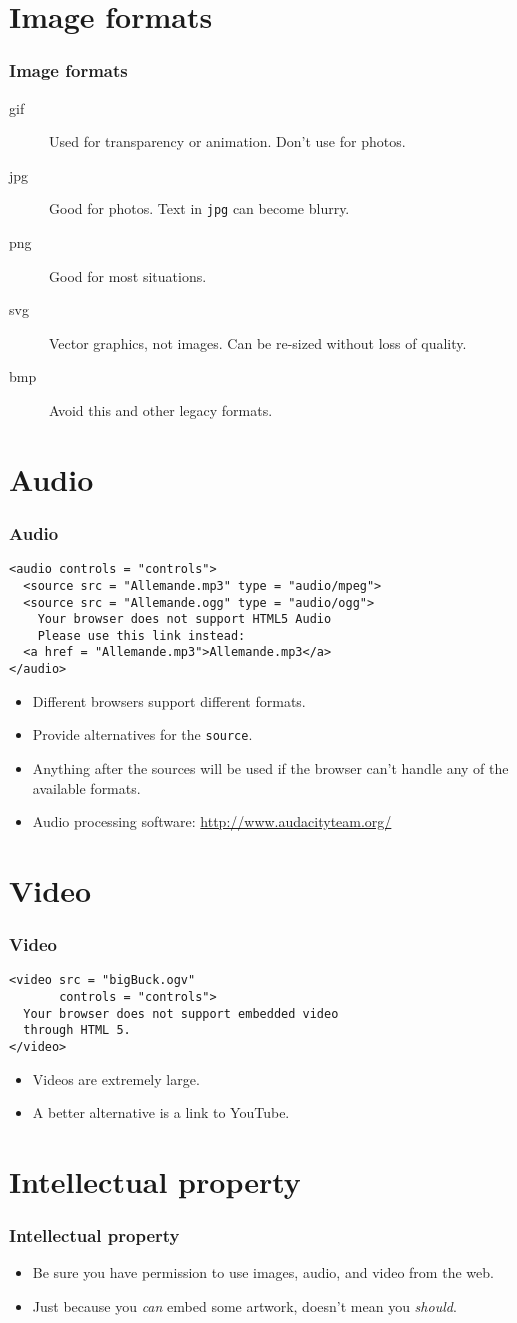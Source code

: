 \documentclass{beamer}
\newcommand{\bi}{\begin{itemize}}
\newcommand{\li}{\item}
\newcommand{\ei}{\end{itemize}}
\newcommand{\sect}[1]{
\section{#1}
\begin{frame}[fragile]\frametitle{#1}
}
\begin{document}
\sect{Image formats}
\begin{description}
  \li[gif] Used for transparency or animation.  Don't use for photos.
  \li[jpg] Good for photos.  Text in {\tt jpg} can become blurry.
  \li[png] Good for most situations.
  \li[svg] Vector graphics, not images.  Can be re-sized without loss
  of quality.
  \li[bmp] Avoid this and other legacy formats.
\end{description}
\end{frame}

\sect{Audio}
\begin{Verbatim}[frame=single]
<audio controls = "controls">
  <source src = "Allemande.mp3" type = "audio/mpeg">
  <source src = "Allemande.ogg" type = "audio/ogg">
    Your browser does not support HTML5 Audio
    Please use this link instead:
  <a href = "Allemande.mp3">Allemande.mp3</a>
</audio>
\end{Verbatim}
\bi
\li Different browsers support different formats.
\li Provide alternatives for the {\tt source}.
\li Anything after the sources will be used if the browser can't
handle any of the available formats.
\li Audio processing software:  \url{http://www.audacityteam.org/}

\ei
\end{frame}


\sect{Video}
\begin{Verbatim}[frame=single]
<video src = "bigBuck.ogv"
       controls = "controls">
  Your browser does not support embedded video
  through HTML 5.
</video>
\end{Verbatim}
\bi
\li Videos are extremely large.
\li A better alternative is a link to YouTube.
\ei

\end{frame}

\sect{Intellectual property}
\bi
\li Be sure you have permission to use images, audio, and video from
the web.
\li Just because you {\em can} embed some artwork, doesn't mean you
    {\em should}.
\ei
\end{frame}    
\end{document}
